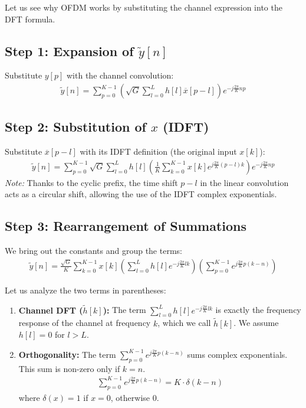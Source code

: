 \documentclass[a4paper, 12pt]{book}
\begin{document}
Let us see why OFDM works by substituting the channel expression into the DFT formula.

\subsection{Step 1: Expansion of $\tilde{y}[n]$}
Substitute $y[p]$ with the channel convolution:
\begin{align}
\tilde{y}[n] = \sum_{p=0}^{K-1} \left( \sqrt{G} \sum_{l=0}^{L} h[l] \overline{x}[p-l] \right) e^{-j \frac{2\pi}{K} np}
\end{align}

\subsection{Step 2: Substitution of $x$ (IDFT)}
Substitute $\overline{x}[p-l]$ with its IDFT definition (the original input $x[k]$):
\begin{align}
\tilde{y}[n] = \sum_{p=0}^{K-1} \sqrt{G} \sum_{l=0}^{L} h[l] \left( \frac{1}{K} \sum_{k=0}^{K-1} x[k] e^{j \frac{2\pi}{K} (p-l)k} \right) e^{-j \frac{2\pi}{K} np}
\end{align}
\textit{Note:} Thanks to the cyclic prefix, the time shift $p-l$ in the linear convolution acts as a circular shift, allowing the use of the IDFT complex exponentials.

\subsection{Step 3: Rearrangement of Summations}
We bring out the constants and group the terms:
\begin{align}
\tilde{y}[n] = \frac{\sqrt{G}}{K} \sum_{k=0}^{K-1} x[k] \left( \sum_{l=0}^{L} h[l] e^{-j \frac{2\pi}{K} lk} \right) \left( \sum_{p=0}^{K-1} e^{j \frac{2\pi}{K} p(k-n)} \right)
\end{align}

Let us analyze the two terms in parentheses:
\begin{enumerate}
    \item \textbf{Channel DFT ($\tilde{h}[k]$):} The term $\sum_{l=0}^{L} h[l] e^{-j \frac{2\pi}{K} lk}$ is exactly the frequency response of the channel at frequency $k$, which we call $\tilde{h}[k]$. We assume $h[l]=0$ for $l>L$.
    \item \textbf{Orthogonality:} The term $\sum_{p=0}^{K-1} e^{j \frac{2\pi}{K} p(k-n)}$ sums complex exponentials. This sum is non-zero only if $k=n$.
    \begin{align}
    \sum_{p=0}^{K-1} e^{j \frac{2\pi}{K} p(k-n)} = K \cdot \delta(k-n)
    \end{align}
    where $\delta(x) = 1$ if $x=0$, otherwise $0$.
\end{enumerate}
\end{document}
